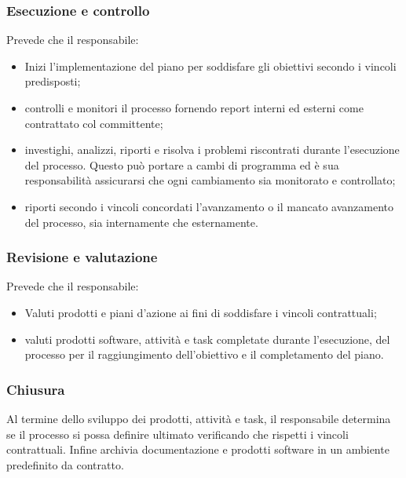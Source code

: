     \subsubsection{Esecuzione e controllo}\label{sec:execution}
        Prevede che il responsabile:
        \begin{itemize}
            \item Inizi l'implementazione del piano per soddisfare gli obiettivi secondo i vincoli predisposti;
            \item controlli e monitori il processo fornendo report interni ed esterni come contrattato col committente;
            \item investighi, analizzi, riporti e risolva i problemi riscontrati durante l'esecuzione del processo. Questo può portare a cambi di programma ed \`e sua responsabilità assicurarsi che ogni cambiamento sia monitorato e controllato;
            \item riporti secondo i vincoli concordati l'avanzamento o il mancato avanzamento del processo, sia internamente che esternamente.
        \end{itemize}
    \subsubsection{Revisione e valutazione}\label{sec:review}
        Prevede che il responsabile:
        \begin{itemize}
            \item Valuti prodotti e piani d'azione ai fini di soddisfare i vincoli contrattuali;
            \item valuti prodotti software, attivit\`a e task completate durante l'esecuzione, del processo per il raggiungimento dell'obiettivo e il completamento del piano.
        \end{itemize}
    \subsubsection{Chiusura}\label{sec:closure}
        Al termine dello sviluppo dei prodotti, attivit\`a e task, il responsabile determina se il processo si possa definire ultimato verificando che rispetti i vincoli contrattuali. Infine archivia documentazione e prodotti software in un ambiente predefinito da contratto.
        
        